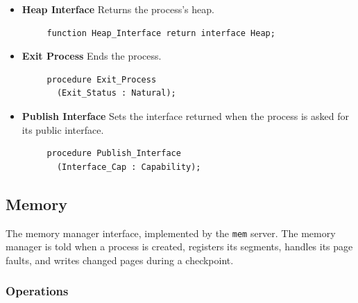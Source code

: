\begin{itemize}
    \item \textbf{Heap Interface} Returns the process's heap.

    \begin{verbatim}
     function Heap_Interface return interface Heap;
    \end{verbatim}

    \item \textbf{Exit Process} Ends the process.

    \begin{verbatim}
     procedure Exit_Process
       (Exit_Status : Natural);
    \end{verbatim}

    \item \textbf{Publish Interface} Sets the interface returned when the process is asked for its public interface.

    \begin{verbatim}
     procedure Publish_Interface
       (Interface_Cap : Capability);
    \end{verbatim}
\end{itemize}

\subsection{Memory}

The memory manager interface, implemented by the {\tt mem} server.  The memory manager is told when a process is created, registers its segments, handles its page faults, and writes changed pages during a checkpoint.

\subsubsection{Operations}

